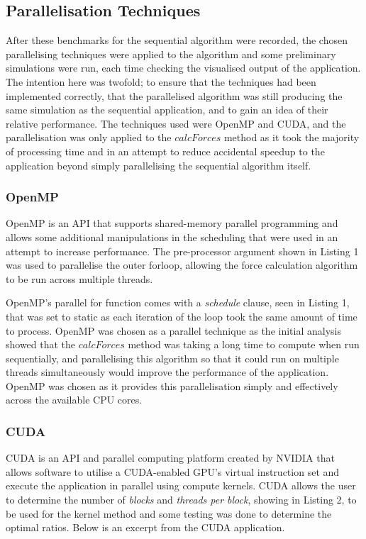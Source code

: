\documentclass[12pt,journal,transmag]{IEEEtran}
\begin{document}
	\subsection{Parallelisation Techniques}
	After these benchmarks for the sequential algorithm were recorded, the chosen parallelising techniques were applied to the algorithm and some preliminary simulations were run, each time checking the visualised output of the application. The intention here was twofold; to ensure that the techniques had been implemented correctly, that the parallelised algorithm was still producing the same simulation as the sequential application, and to gain an idea of their relative performance. The techniques used were OpenMP and CUDA, and the parallelisation was only applied to the $calcForces$ method as it took the majority of processing time and in an attempt to reduce accidental speedup to the application beyond simply parallelising the sequential algorithm itself.
	
	\subsubsection{OpenMP}
	OpenMP is an API that supports shared-memory parallel programming and allows some additional manipulations in the scheduling that were used in an attempt to increase performance. The pre-processor argument shown in Listing 1 was used to parallelise the outer forloop, allowing the force calculation algorithm to be run across multiple threads.
	
	
	
	OpenMP's parallel for function comes with a \textit{schedule} clause, seen in Listing 1, that was set to static as each iteration of the loop took the same amount of time to process. OpenMP was chosen as a parallel technique as the initial analysis showed that the $calcForces$ method was taking a long time to compute when run sequentially, and parallelising this algorithm so that it could run on multiple threads simultaneously would improve the performance of the application. OpenMP was chosen as it provides this parallelisation simply and effectively across the available CPU cores.
	
	\subsubsection{CUDA}
	CUDA is an API and parallel computing platform created by NVIDIA that allows software to utilise a CUDA-enabled GPU's virtual instruction set and execute the application in parallel using compute kernels. CUDA allows the user to determine the number of \textit{blocks} and \textit{threads per block}, showing in Listing 2, to be used for the kernel method and some testing was done to determine the optimal ratios. Below is an excerpt from the CUDA application.
	
\end{document}

